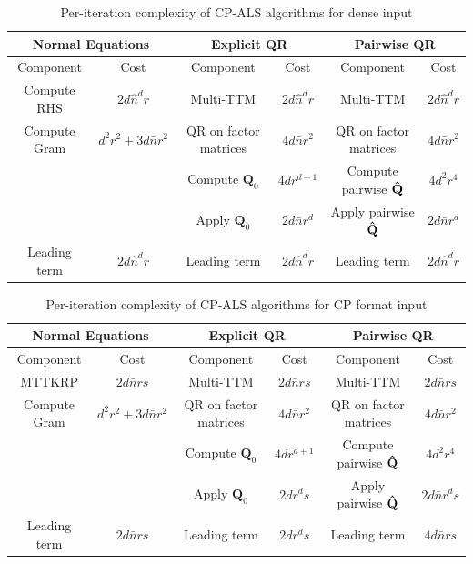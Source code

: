 \documentclass{article}
\newcommand{\mat}[1]{\mathbf{#1}}
\newcommand{\M}[2][]{\bm{#1{\mathbf{\MakeUppercase{#2}}}}} 		%
\begin{document}
\begin{table}[!ht] 
  \centering
  \begin{tabular}{|c|c|c|c|c|c|}
    \hline
    \multicolumn{2}{|c|}{\textbf{Normal Equations}} & \multicolumn{2}{|c|}{\textbf{Explicit QR}} & \multicolumn{2}{|c|}{\textbf{Pairwise QR}} \\
    \hline
    Component & Cost & Component & Cost & Component & Cost \\
    \hline
    Compute RHS &$2d \hat{n}^d r$ &Multi-TTM &$2d\hat n^d r$  & Multi-TTM &$2d\hat n^d r$  \\
    Compute Gram & $d^2r^2 + 3d \bar{n} r^2$&QR on factor matrices & $4d \bar n r^2$ & QR on factor matrices & $4d \bar n r^2$\\
     & &Compute $\mat{Q}_0$ & $4dr^{d+1}$& Compute pairwise $\M[\hat]{Q}$ & $4d^2r^4$\\
     & &Apply $\mat{Q}_0$& $2d\bar n r^d$& Apply pairwise $\M[\hat]{Q}$ & $2d\bar n r^d$\\
    \hline
    Leading term & $2d \hat{n}^d r$ & Leading term & $2d \hat{n}^d r$ & Leading term & $2d \hat{n}^d r$ \\
    \hline
  \end{tabular}
  \caption{Per-iteration complexity of CP-ALS algorithms for dense input}
  \label{tab:dense_its_part}
\end{table}

\begin{table}[!ht] 
  \centering
  \begin{tabular}{|c|c|c|c|c|c|}
    \hline
    \multicolumn{2}{|c|}{\textbf{Normal Equations}} & \multicolumn{2}{|c|}{\textbf{Explicit QR}} & \multicolumn{2}{|c|}{\textbf{Pairwise QR}} \\
    \hline
    Component & Cost & Component & Cost & Component & Cost \\
    \hline
    MTTKRP & $2d\bar n rs$ &  Multi-TTM &$2d\bar n rs$  & Multi-TTM &$2d\bar n rs$  \\
    Compute Gram & $d^2r^2+3d\bar n r^2$&QR on factor matrices & $4d \bar n r^2$ & QR on factor matrices & $4d \bar n r^2$\\
    & &Compute $\mat{Q}_0$ & $4dr^{d+1}$& Compute pairwise $\M[\hat]{Q}$ & $4d^2r^4$\\
     & &Apply $\mat{Q}_0$& $2dr^ds$& Apply pairwise $\M[\hat]{Q}$ & $2d \bar n r^ds$\\
    \hline
     Leading term & $2d\bar n rs$ & Leading term & $2dr^ds$ & Leading term & $4d\bar n rs$ \\
    \hline
  \end{tabular}
  \caption{Per-iteration complexity of CP-ALS algorithms for CP format input}
  \label{tab:kruskal_its_part}
\end{table}
\end{document}
